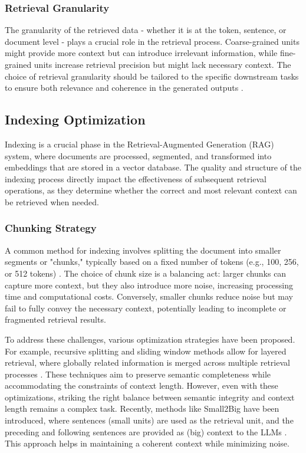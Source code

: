 \subsubsection{Retrieval Granularity}

The granularity of the retrieved data - whether it is at the token, sentence, or document level - plays a crucial role in the retrieval process. Coarse-grained units might provide more context but can introduce irrelevant information, while fine-grained units increase retrieval precision but might lack necessary context. The choice of retrieval granularity should be tailored to the specific downstream tasks to ensure both relevance and coherence in the generated outputs \cite{gao2023retrieval}.

\subsection{Indexing Optimization}

Indexing is a crucial phase in the Retrieval-Augmented Generation (RAG) system, where documents are processed, segmented, and transformed into embeddings that are stored in a vector database. The quality and structure of the indexing process directly impact the effectiveness of subsequent retrieval operations, as they determine whether the correct and most relevant context can be retrieved when needed.

\subsubsection{Chunking Strategy}

A common method for indexing involves splitting the document into smaller segments or "chunks," typically based on a fixed number of tokens (e.g., 100, 256, or 512 tokens) \cite{teja2023chunk}. The choice of chunk size is a balancing act: larger chunks can capture more context, but they also introduce more noise, increasing processing time and computational costs. Conversely, smaller chunks reduce noise but may fail to fully convey the necessary context, potentially leading to incomplete or fragmented retrieval results.

To address these challenges, various optimization strategies have been proposed. For example, recursive splitting and sliding window methods allow for layered retrieval, where globally related information is merged across multiple retrieval processes \cite{langchain2023recursive}. These techniques aim to preserve semantic completeness while accommodating the constraints of context length. However, even with these optimizations, striking the right balance between semantic integrity and context length remains a complex task. Recently, methods like Small2Big have been introduced, where sentences (small units) are used as the retrieval unit, and the preceding and following sentences are provided as (big) context to the LLMs \cite{yang2023smalltobig}. This approach helps in maintaining a coherent context while minimizing noise.

